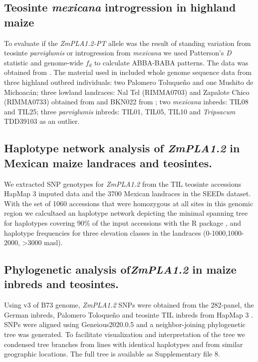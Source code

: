 \documentclass[9pt,twocolumn,twoside]{BioRxiv}
\begin{document}
\subsection{Teosinte \textit{mexicana} introgression in highland maize}
To evaluate if the \textit{ZmPLA1.2-PT} allele was the result of standing variation from teosinte \textit{parviglumis} or introgression from \textit{mexicana} we used Patterson's \textit{D} statistic and genome-wide $f_{d}$ to calculate ABBA-BABA patterns. 
The data was obtained from \cite{Gonzalez-Segovia2019-jy}. 
The material used in \cite{Gonzalez-Segovia2019-jy} included whole genome sequence data from three highland outbred individuals: two Palomero Toluqueño and one Mushito de Michoacán; three lowland landraces: Nal Tel (RIMMA0703) and Zapalote Chico (RIMMA0733) obtained from \cite{Wang2017-bc} and  BKN022 from \cite{Bukowski2017-ng}; two \textit{mexicana} inbreds: TIL08 and TIL25; three \textit{parviglumis} inbreds: TIL01, TIL05, TIL10 and \textit{Tripsacum} TDD39103 \cite{Bukowski2017-ng} as an outlier. 

\subsection{Haplotype network analysis of \textit{ZmPLA1.2} in Mexican maize landraces and teosintes.}
We extracted SNP genotypes for \textit{ZmPLA1.2} from the TIL teosinte accessions HapMap 3 imputed data \cite{Bukowski2017-ng} and the 3700 Mexican landraces in the SEEDs dataset. 
With the set of 1060 accessions that were homozygous at all sites in this genomic region we calcultaed an haplotype network depicting the minimal spanning tree for haplotypes covering 90\% of the input accessions with the R package  \cite{paradis2010}, and haplotype frequencies for three elevation classes in the landraces (0-1000,1000-2000, >3000 masl).

\subsection{Phylogenetic analysis of\textit{ZmPLA1.2} in maize inbreds and teosintes.}
Using v3 of B73 genome, \textit{ZmPLA1.2} SNPs were obtained from the 282-panel, the German inbreds, Palomero Toloqueño and teosinte TIL inbreds from HapMap 3 \cite{Bukowski2017-ng}. 
SNPs were aligned using Geneious2020.0.5 and a neighbor-joining phylogenetic tree was generated. 
To facilitate visualization and interpretation of the tree we condensed tree branches from lines with identical haplotypes and from similar geographic locations. 
The full tree is available as Supplementary file 8. 
\end{document}
